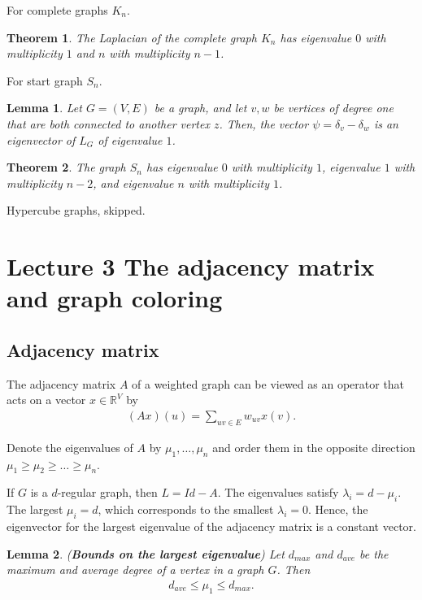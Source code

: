 \documentclass[]{article}
\newtheorem{theorem}{Theorem}[section]
\newtheorem{lemma}{Lemma}[section]
\begin{document}
	For complete graphs $K_n$. 
	
	\begin{theorem}
		The Laplacian of the complete graph $K_n$ has eigenvalue $0$ with multiplicity $1$ and $n$ with multiplicity $n-1$.
	\end{theorem}
	
	For start graph $S_n$. 
	
	\begin{lemma}
		Let $G=(V,E)$ be a graph, and let $v,w$ be vertices of degree one that are both connected to another vertex $z$. Then, the vector $\psi=\delta_v-\delta_w$ is an eigenvector of $L_G$ of eigenvalue $1$. 
	\end{lemma}
	
	\begin{theorem}
		The graph $S_n$ has eigenvalue $0$ with multiplicity $1$, eigenvalue $1$ with multiplicity $n-2$, and eigenvalue $n$ with multiplicity $1$. 
	\end{theorem}
	
	Hypercube graphs, skipped. 
	
	\section{Lecture 3 The adjacency matrix and graph coloring}
	
	\subsection{Adjacency matrix}
	The adjacency matrix $A$ of a weighted graph can be viewed as an operator that acts on a vector $x \in \mathbb{R}^V$ by 
	\begin{align*}
	(Ax)(u) = \sum_{uv\in E} w_{uv}x(v).
	\end{align*}
	
	Denote the eigenvalues of $A$ by $\mu_1, \dots, \mu_n$ and order them in the opposite direction $\mu_1 \ge \mu_2 \ge \dots \ge \mu_n$. 
	
	If $G$ is a $d$-regular graph, then $L = Id-A$. The eigenvalues satisfy $\lambda_i = d- \mu_i$. The largest $\mu_i=d$, which corresponds to the smallest $\lambda_i=0$. Hence, the eigenvector for the largest eigenvalue of the adjacency matrix is a constant vector. 
	
	\begin{lemma} (\textbf{Bounds on the largest eigenvalue})
		Let $d_{max}$ and $d_{ave}$ be the maximum and average degree of a vertex in a graph $G$. Then 
		\begin{align*}
		d_{ave} \le \mu_1 \le d_{max}.
		\end{align*}
	\end{lemma}
	
\end{document}
